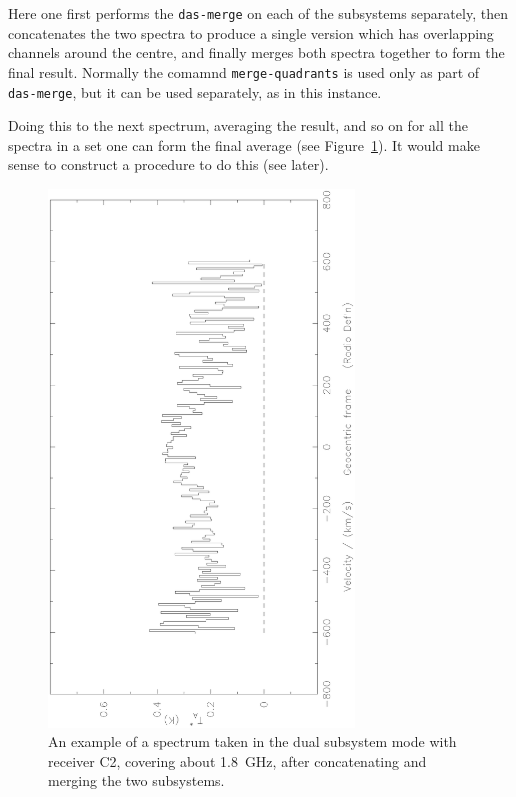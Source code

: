 \documentclass[11pt,twoside]{article}
\begin{document}
Here one first performs the {\tt das-merge} on each of the subsystems
separately, then concatenates the two spectra to produce a single
version which has overlapping channels around the centre, and finally
merges both spectra together to form the final result. Normally the
comamnd {\tt merge-quadrants} is used only as part of {\tt das-merge},
but it can be used separately, as in this instance.

Doing this to the next spectrum, averaging the result, and so on for
all the spectra in a set one can form the final average (see
Figure~\ref{fig:concatenation}). It would make sense to construct a
procedure to do this (see later).

\begin{figure}[htb]
\centering
\includegraphics[angle=-90,width=3.2in]{sc8_concat.ps}
\vspace*{-0.5cm}
\begin{center}
\begin{minipage}[t]{5in}
\caption[Extreme wideband spectra (concatenation)]
{\small{An example of a spectrum taken in the dual subsystem mode with
receiver C2, covering about 1.8~GHz, after concatenating and merging
the two subsystems.
 }}
\label{fig:concatenation}
\end{minipage}
\end{center}
\end{figure}
\end{document}
